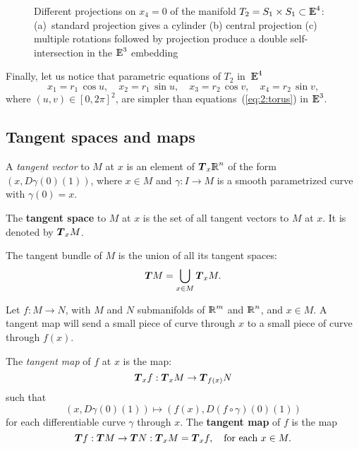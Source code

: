 \documentclass{31x47jw}
\begin{document}
\begin{example}
\begin{figure}[htb]
\centering{}
\hfill
\centering{}
\hfill
\centering{}
\caption{Different projections on $x_{4}=0$ of the manifold
$T_{2}=S_{1}\times S_{1} \subset\mathbb{I\!\!E}^{4}$:  (a)~standard projection
gives a cylinder (b) central projection (c) multiple rotations
followed by projection produce a double self-intersection in the
$\mathbb{I\!\!E}^{3}$ embedding
\label{fig:5:toro4d}}
\end{figure}


Finally, let us notice that parametric equations  of $T_{2}$ in~$\mathbb{I\!\!E}^{4}$ 
\[
    x_{1} = r_{1}\,\cos u,\quad
    x_{2} = r_{1}\,\sin u,\quad
    x_{3} = r_{2}\,\cos v,\quad
    x_{4} = r_{2}\,\sin v,
\]
where $(u,v) \in [0,2\pi]^{2}$, are simpler than
equations~(\ref{eq:2:torus}) in $\mathbb{I\!\!E}^{3}$.
    
\label{ex:5:circles2torus}
\end{example}






\subsection{Tangent spaces and maps}

A \emph{tangent vector} to $M$ at $x$ is an element of
${\mbox{\boldmath $T$}}_{x}\mathbb{I\!\!R}^{n}$ of the form $(x, D\gamma(0)(1))$, where $x\in M$
and $\gamma: I\rightarrow M$ is a smooth parametrized curve with
$\gamma(0) = x$.

The \textbf{tangent space} to $M$ at $x$ is the set of all tangent
vectors to $M$ at $x$.  It is denoted by ${\mbox{\boldmath $T$}}_{x}M$.

The tangent bundle of $M$ is the union of all its tangent spaces:
\[
{\mbox{\boldmath $T$}}M = \bigcup_{x\in M}{\mbox{\boldmath $T$}}_{x}M.
\]

    Let $f: M\rightarrow N$, with $M$ and $N$ submanifolds of $\mathbb{I\!\!R}^{m}$ 
and $\mathbb{I\!\!R}^{n}$, and $x\in M$.
A tangent map will send a small piece of curve through $x$ to a 
small piece of curve through $f(x)$.

The \emph{tangent map} of $f$ at $x$ is the map:
\[
{\mbox{\boldmath $T$}}_{x}f : {\mbox{\boldmath $T$}}_{x} M \rightarrow {\mbox{\boldmath $T$}}_{f(x)} N 
\]
such that 
\[
(x,D\gamma(0)(1)) \mapsto (f(x), D(f \circ \gamma)(0)(1))
\]
for each differentiable curve $\gamma$ through $x$.  The
\textbf{tangent map} of $f$ is the map
\[
{\mbox{\boldmath $T$}}f : {\mbox{\boldmath $T$}}M \rightarrow {\mbox{\boldmath $T$}}N : {\mbox{\boldmath $T$}}_{x}M = {\mbox{\boldmath $T$}}_{x}f,
\quad\mbox{for each\ }x\in M .
\]
\end{document}
